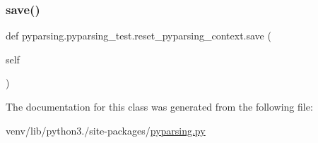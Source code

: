 \subsubsection{\texorpdfstring{save()}{save()}}
{\footnotesize\ttfamily def pyparsing.\+pyparsing\+\_\+test.\+reset\+\_\+pyparsing\+\_\+context.\+save (\begin{DoxyParamCaption}\item[{}]{self }\end{DoxyParamCaption})}



The documentation for this class was generated from the following file\+:\begin{DoxyCompactItemize}
\item 
venv/lib/python3./site-\/packages/\hyperlink{pyparsing_8py}{pyparsing.\+py}\end{DoxyCompactItemize}
